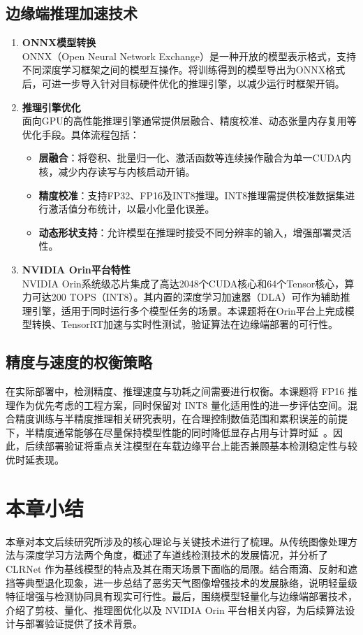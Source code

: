 \subsection{边缘端推理加速技术}
\begin{enumerate}[label=(\arabic*)]
	\item \textbf{ONNX模型转换} \\
	ONNX（Open Neural Network Exchange）是一种开放的模型表示格式，支持不同深度学习框架之间的模型互操作。将训练得到的模型导出为ONNX格式后，可进一步导入针对目标硬件优化的推理引擎，以减少运行时框架开销。
	
	\item \textbf{推理引擎优化} \\
	面向GPU的高性能推理引擎通常提供层融合、精度校准、动态张量内存复用等优化手段。具体流程包括：
	\begin{itemize}
		\item \textbf{层融合}：将卷积、批量归一化、激活函数等连续操作融合为单一CUDA内核，减少内存读写与内核启动开销。
		\item \textbf{精度校准}：支持FP32、FP16及INT8推理。INT8推理需提供校准数据集进行激活值分布统计，以最小化量化误差。
		\item \textbf{动态形状支持}：允许模型在推理时接受不同分辨率的输入，增强部署灵活性。
	\end{itemize}
	
	\item \textbf{NVIDIA Orin平台特性} \\
	NVIDIA Orin系统级芯片集成了高达2048个CUDA核心和64个Tensor核心，算力可达200 TOPS（INT8）。其内置的深度学习加速器（DLA）可作为辅助推理引擎，适用于同时运行多个模型任务的场景。本课题将在Orin平台上完成模型转换、TensorRT加速与实时性测试，验证算法在边缘端部署的可行性。
\end{enumerate}

\subsection{精度与速度的权衡策略}
在实际部署中，检测精度、推理速度与功耗之间需要进行权衡。本课题将 FP16 推理作为优先考虑的工程方案，同时保留对 INT8 量化适用性的进一步评估空间。混合精度训练与半精度推理相关研究表明，在合理控制数值范围和累积误差的前提下，半精度通常能够在尽量保持模型性能的同时降低显存占用与计算时延~\cite{micikevicius2018mixedprecision}。因此，后续部署验证将重点关注模型在车载边缘平台上能否兼顾基本检测稳定性与较优时延表现。

\section{本章小结}
\label{sec:summary_2}
本章对本文后续研究所涉及的核心理论与关键技术进行了梳理。从传统图像处理方法与深度学习方法两个角度，概述了车道线检测技术的发展情况，并分析了 CLRNet 作为基线模型的特点及其在雨天场景下面临的局限。结合雨滴、反射和遮挡等典型退化现象，进一步总结了恶劣天气图像增强技术的发展脉络，说明轻量级特征增强与检测协同具有现实可行性。最后，围绕模型轻量化与边缘端部署技术，介绍了剪枝、量化、推理图优化以及 NVIDIA Orin 平台相关内容，为后续算法设计与部署验证提供了技术背景。

